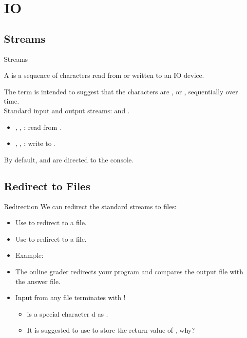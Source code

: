 \documentclass{beamer}
\begin{document}
\section{IO}

\subsection{Streams}

\begin{frame}{Streams}
    \begin{dfn}[Stream]
        A  is a sequence of characters read from or written to an IO device.
    \end{dfn}
    The term  is intended to suggest that the characters are , or , sequentially over time.\\
    \pause
    Standard input and output streams:  and .
    \begin{itemize}
        \item {}, , : read from .
        \item {}, , : write to .
    \end{itemize}
    By default,  and  are directed to the console.
\end{frame}

\subsection{Redirect to Files}

\begin{frame}{Redirection}
    We can redirect the standard streams to files:
    \begin{itemize}
        \item Use  to redirect  to a file.
        \item Use  to redirect  to a file.
        \pause
        \item Example: 
        \item The online grader redirects your program and compares the output file with the answer file.
        \pause
        \item Input from any file terminates with !
        \begin{itemize}
            \item {} is a special character d as .
            \item It is suggested to use  to store the return-value of , why?
        \end{itemize}
    \end{itemize}
\end{frame}
\end{document}
